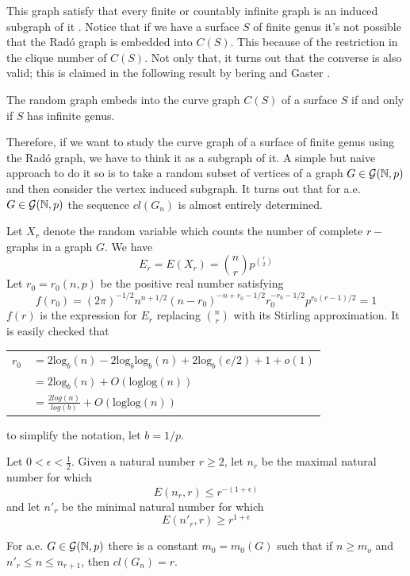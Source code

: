 This graph satisfy that every finite or countably infinite graph is an induced subgraph of it \cite{DarReferenciaAqui1}. Notice that if we have a surface $S$ of finite genus it's not possible that the Radó graph is embedded into $C(S)$. This because of the restriction in the clique number of $C(S)$. Not only that, it turns out that the converse is also valid; this is claimed in the following result by bering and Gaster \cite{}.

\begin{theorem}
The random graph embeds into the curve graph $C(S)$ of a surface $S$ if and only if $S$ has infinite genus.
\end{theorem}

Therefore, if we want to study the curve graph of a surface of finite genus using the Radó graph, we have to think it as a subgraph of it. A simple but naive approach to do it so is to take a random subset of vertices of a graph $G\in \mathcal{G}(\mathbb{N}, p)$ and then consider the vertex induced subgraph. It turns out that for a.e. $G\in \mathcal{G}(\mathbb{N}, p)$ the sequence $cl(G_n)$ is almost entirely determined.

Let $X_r$ denote the random variable which counts the number of complete $r-$graphs in a graph $G$. We have
$$E_{r} = E(X_r) = \binom{n}{r}p^{\binom{r}{2}}$$
Let $r_0 = r_0(n,p)$ be the positive real number satisfying
$$f (r_0) = (2\pi)^{- 1/2} n^{n+ 1/2} (n - r_0)^{-n+r_0-1/2} r_0^{-r_0- 1/2} p^{r_0(r- 1)/2} =1$$
$f(r)$ is the expression for $E_r$ replacing $\binom{n}{r}$ with its Stirling approximation.
It is easily checked that
\begin{center}
\begin{tabular}{ r l }
$r_0$ & $ = 2 \text{log}_{b}(n) - 2 \text{log}_{b} \text{log}_{b}(n) + 2 \text{log}_{b}(e/ 2) + 1 + o(1)$ \\
& $= 2 \text{log}_{b}(n) + O(\text{loglog} (n))$\\
& $= \frac{2log(n)}{log(b)} + O(\text{loglog}(n))$
\end{tabular}
\end{center}

to simplify the notation, let $b=1/p$.

Let $0<\epsilon<\frac{1}{2}$. Given a natural number $r \geq 2$, let $n_r$ be the maximal natural number for which
$$E(n_r, r) \leq r^{-(1+\epsilon)}$$
and let $n'_{r}$ be the minimal natural number for which
$$E(n'_{r}, r)\geq r^{1+\epsilon}$$

\begin{theorem}
For a.e. $G \in \mathcal{G}(\mathbb{N},p)$ there is a constant $m_0 = m_{0}(G)$ such that if $n \geq m_o$ and $n'_{r} \leq n \leq n_{r+1}$, then $cl(G_{n}) = r$.
\end{theorem}

